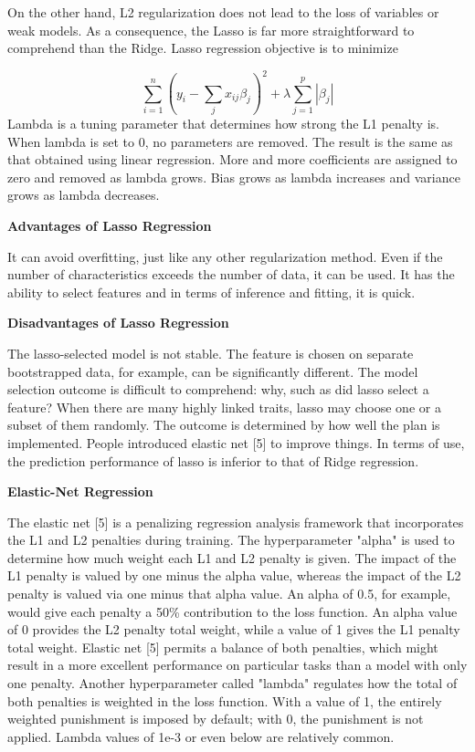 \documentclass{article} %
\begin{document}
\noindent On the other hand, L2 regularization does not lead to the loss of variables or weak models. As a consequence, the Lasso is far more straightforward to comprehend than the Ridge. Lasso regression objective is to minimize

\noindent 
\begin{equation} \label{GrindEQ__7_} 
\sum^n_{i=1}{{\left(y_i-\sum_j{x_{ij}{\beta }_j}\right)}^2}+\lambda \sum^p_{j=1}{\left|{\beta }_j\right|} 
\end{equation} 
Lambda is a tuning parameter that determines how strong the L1 penalty is. When lambda is set to 0, no parameters are removed. The result is the same as that obtained using linear regression. More and more coefficients are assigned to zero and removed as lambda grows. Bias grows as lambda increases and variance grows as lambda decreases.

\noindent \textbf{Advantages of Lasso Regression}

\noindent It can avoid overfitting, just like any other regularization method. Even if the number of characteristics exceeds the number of data, it can be used. It has the ability to select features and in terms of inference and fitting, it is quick.

\noindent \textbf{Disadvantages of Lasso Regression}

\noindent The lasso-selected model is not stable. The feature is chosen on separate bootstrapped data, for example, can be significantly different. The model selection outcome is difficult to comprehend: why, such as did lasso select a feature? When there are many highly linked traits, lasso may choose one or a subset of them randomly. The outcome is determined by how well the plan is implemented. People introduced elastic net [5] to improve things. In terms of use, the prediction performance of lasso is inferior to that of Ridge regression.

\noindent \textbf{Elastic-Net Regression}

\noindent The elastic net [5] is a penalizing regression analysis framework that incorporates the L1 and L2 penalties during training. The hyperparameter "alpha" is used to determine how much weight each L1 and L2 penalty is given. The impact of the L1 penalty is valued by one minus the alpha value, whereas the impact of the L2 penalty is valued via one minus that alpha value. An alpha of 0.5, for example, would give each penalty a 50\% contribution to the loss function. An alpha value of 0 provides the L2 penalty total weight, while a value of 1 gives the L1 penalty total weight. Elastic net [5] permits a balance of both penalties, which might result in a more excellent performance on particular tasks than a model with only one penalty. Another hyperparameter called "lambda" regulates how the total of both penalties is weighted in the loss function. With a value of 1, the entirely weighted punishment is imposed by default; with 0, the punishment is not applied. Lambda values of 1e-3 or even below are relatively common.
\end{document}
